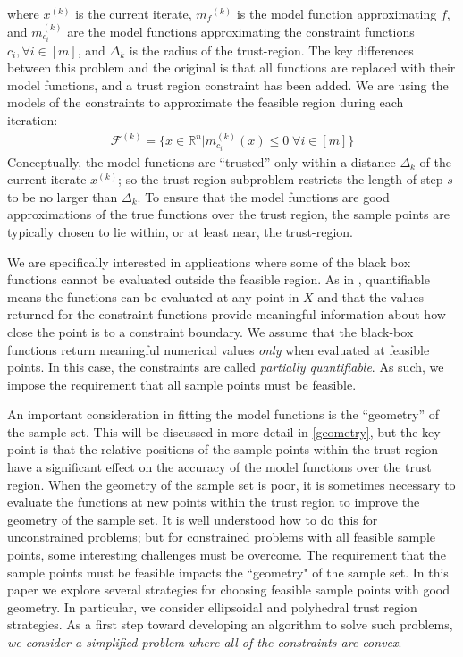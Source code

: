 \documentclass{article}
\theoremstyle{case}
\numberwithin{theorem}{subsection}
\newcommand{\dk}{\Delta_k}
\newcommand{\feasiblek}{{\mathcal F^{(k)}}}
\newcommand{\mcik}{{{m}^{(k)}_{c_i}}}
\newcommand{\mfk}{{{m}_f}^{(k)}}
\newcommand{\Rn}{\mathbb R^n}
\newcommand{\xk}{x^{(k)}}
\begin{document}
where $\xk$ is the current iterate, $\mfk$ is the model function approximating $f$, 
and $\mcik$ are the model functions approximating the constraint functions $c_i, \forall i \in [m]$, and $\dk$ is the radius of the trust-region.
The key differences between this problem and the original is that all functions are replaced with their model functions, and a trust region constraint has been added.
We are using the models of the constraints to approximate the feasible region during each iteration:
\begin{align}
\feasiblek = \{x \in \Rn | \mcik(x) \le 0 \; \forall i \in [m] \} \label{define_feasiblek}
\end{align}
Conceptually, the model functions are ``trusted'' only within a distance $ \dk $ of the current iterate $\xk$; so the trust-region subproblem restricts the length of step $s$ to be no larger than $\dk$.
To ensure that the model functions are good approximations of the true functions over the trust region, the sample points are typically chosen to lie within, or at least near, the trust-region.


We are specifically interested in applications where some of the black box functions cannot be evaluated outside the feasible region.
As in \cite{digabel2015taxonomy}, quantifiable means the functions can be evaluated at any point in $X$ and that the values returned for the constraint functions provide meaningful information about how close the point is to a constraint boundary.
We assume that the black-box functions return meaningful numerical values \emph{only} when evaluated at feasible points.
In this case, the constraints are called {\em partially quantifiable}.   
As such, we impose the requirement that all sample points must be feasible.

An important consideration in fitting the model functions is the ``geometry'' of the sample set.
This will be discussed in more detail in \cref{geometry}, but the key point is that the relative positions of the sample points within the trust region have a significant effect on the accuracy of the model functions over the trust region.
When the geometry of the sample set is poor, it is sometimes necessary to evaluate the functions at new points within the trust region to improve the geometry of the sample set.
It is well understood how to do this for unconstrained problems; but for constrained problems with all feasible sample points, some interesting challenges must be overcome.
\color{red}
The requirement that the sample points must be feasible impacts the ``geometry" of the sample set.
In this paper we explore several strategies for choosing feasible sample points with good geometry.
In particular, we consider ellipsoidal and polyhedral trust region strategies.
\color{black}
As a first step toward developing an algorithm to solve such problems, \emph{we consider a simplified problem where all of the constraints are convex}.
\end{document}

